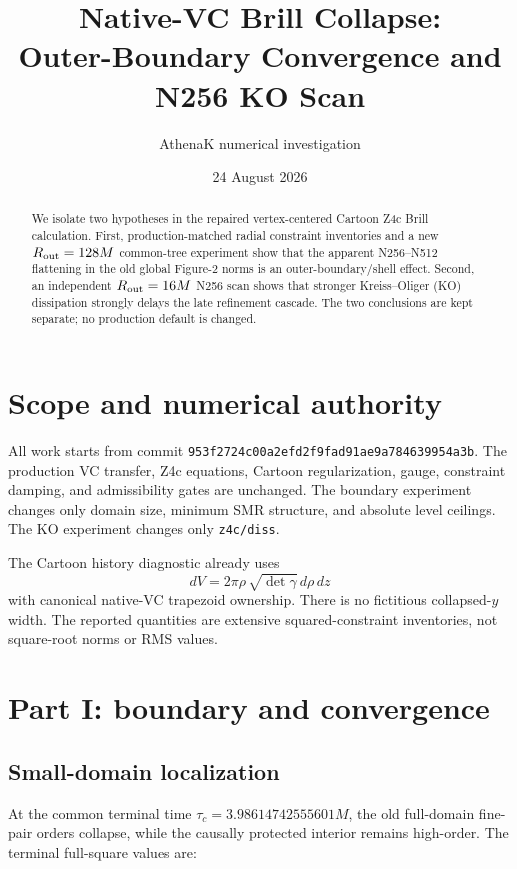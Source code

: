 \documentclass[11pt]{article}
\title{Native-VC Brill Collapse:\\Outer-Boundary Convergence and N256 KO Scan}
\author{AthenaK numerical investigation}
\date{24 August 2026}
\begin{document}
\maketitle

\begin{abstract}
We isolate two hypotheses in the repaired vertex-centered Cartoon Z4c Brill
calculation. First, production-matched radial constraint inventories and a new
$R_{\rm out}=128M$ common-tree experiment show that the apparent N256--N512
flattening in the old global Figure-2 norms is an outer-boundary/shell effect.
Second, an independent $R_{\rm out}=16M$ N256 scan shows that stronger
Kreiss--Oliger (KO) dissipation strongly delays the late refinement cascade.
The two conclusions are kept separate; no production default is changed.
\end{abstract}

\section{Scope and numerical authority}

All work starts from commit
\texttt{953f2724c00a2efd2f9fad91ae9a784639954a3b}.
The production VC transfer, Z4c equations, Cartoon regularization, gauge,
constraint damping, and admissibility gates are unchanged. The boundary
experiment changes only domain size, minimum SMR structure, and absolute level
ceilings. The KO experiment changes only \texttt{z4c/diss}.

The Cartoon history diagnostic already uses
\[
 dV=2\pi\rho\,\sqrt{\det\gamma}\,d\rho\,dz
\]
with canonical native-VC trapezoid ownership. There is no fictitious
collapsed-$y$ width. The reported quantities are extensive squared-constraint
inventories, not square-root norms or RMS values.

\section{Part I: boundary and convergence}

\subsection{Small-domain localization}

At the common terminal time $\tau_c=3.98614742555601M$, the old full-domain
fine-pair orders collapse, while the causally protected interior remains
high-order. The terminal full-square values are:
\end{document}
